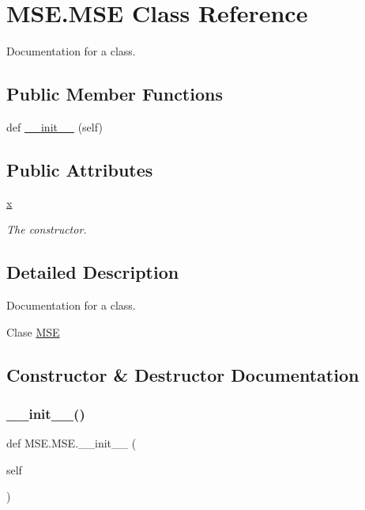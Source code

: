 \hypertarget{class_m_s_e_1_1_m_s_e}{}\section{M\+S\+E.\+M\+SE Class Reference}
\label{class_m_s_e_1_1_m_s_e}


Documentation for a class.  


\subsection*{Public Member Functions}
\begin{DoxyCompactItemize}
\item 
def \mbox{\hyperlink{class_m_s_e_1_1_m_s_e_ac2559b4cd1350480bef5c2cbefd0afe6}{\+\_\+\+\_\+init\+\_\+\+\_\+}} (self)
\end{DoxyCompactItemize}
\subsection*{Public Attributes}
\begin{DoxyCompactItemize}
\item 
\mbox{\hyperlink{class_m_s_e_1_1_m_s_e_a3c8a7df08d33bbbdcce9204075542b25}{x}}
\begin{DoxyCompactList}\small\item\em The constructor. \end{DoxyCompactList}\end{DoxyCompactItemize}


\subsection{Detailed Description}
Documentation for a class. 

Clase \mbox{\hyperlink{class_m_s_e_1_1_m_s_e}{M\+SE}} 

\subsection{Constructor \& Destructor Documentation}
\mbox{\label{class_m_s_e_1_1_m_s_e_ac2559b4cd1350480bef5c2cbefd0afe6}} 
\subsubsection{\texorpdfstring{\+\_\+\+\_\+init\+\_\+\+\_\+()}{\_\_init\_\_()}}
{\footnotesize\ttfamily def M\+S\+E.\+M\+S\+E.\+\_\+\+\_\+init\+\_\+\+\_\+ (\begin{DoxyParamCaption}\item[{}]{self }\end{DoxyParamCaption})}



